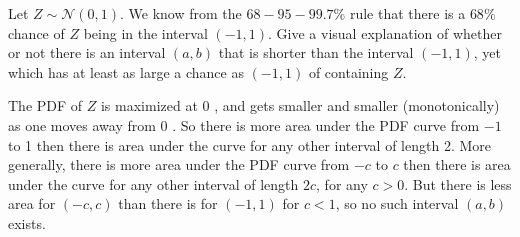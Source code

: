 

\setcounter{theorem}{26}
\begin{exercise}[BH.5.27] Let $Z \sim \mathcal{N}(0,1)$. We know from the $68-95-99.7 \%$ rule that there is a $68 \%$ chance of $Z$ being in the interval $(-1,1)$. Give a visual explanation of whether or not there is an interval $(a, b)$ that is shorter than the interval $(-1,1)$, yet which has at least as large a chance as $(-1,1)$ of containing $Z$.
\begin{solution}
    The PDF of $Z$ is maximized at 0 , and gets smaller and smaller (monotonically) as one moves away from 0 . So there is more area under the PDF curve from $-1$ to 1 then there is area under the curve for any other interval of length 2. More generally, there is more area under the PDF curve from $-c$ to $c$ then there is area under the curve for any other interval of length $2 c$, for any $c>0$. But there is less area for $(-c, c)$ than there is for $(-1,1)$ for $c<1$, so no such interval $(a, b)$ exists.
\end{solution}
\end{exercise}


